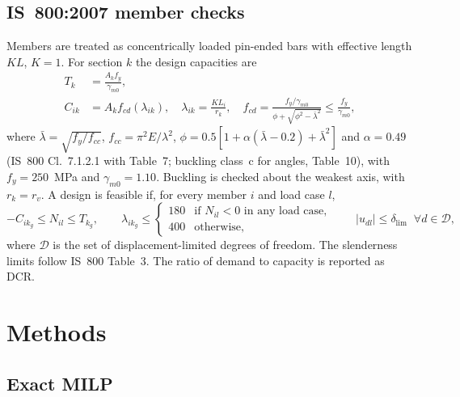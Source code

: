 \documentclass[lineno,pdflatex,sn-mathphys-num]{sn-jnl}
\begin{document}
\subsection{IS~800:2007 member checks}
Members are treated as concentrically loaded pin-ended bars with effective
length $KL$, $K=1$. For section $k$ the design capacities are
\begin{align}
  T_{k} &= \frac{A_k f_y}{\gamma_{m0}}, \label{eq:T}\\
  C_{ik} &= A_k f_{cd}(\lambda_{ik}),\quad \lambda_{ik}=\frac{KL_i}{r_k},\quad
  f_{cd}=\frac{f_y/\gamma_{m0}}{\phi+\sqrt{\phi^2-\bar\lambda^2}}\le\frac{f_y}{\gamma_{m0}},
  \label{eq:C}
\end{align}
where $\bar\lambda=\sqrt{f_y/f_{cc}}$, $f_{cc}=\pi^2E/\lambda^2$,
$\phi=0.5[1+\alpha(\bar\lambda-0.2)+\bar\lambda^2]$ and $\alpha=0.49$
(IS~800 Cl.~7.1.2.1 with Table~7; buckling class~c for angles, Table~10), with $f_y=250$~MPa and
$\gamma_{m0}=1.10$. Buckling is checked about the weakest axis, with $r_k=r_v$. A design is
feasible if, for every member $i$ and load case $l$,
\begin{equation}
  -C_{ik_g}\le N_{il}\le T_{k_g},\qquad
  \lambda_{ik_g}\le\begin{cases}180 & \text{if } N_{il}<0 \text{ in any load case},\\ 400 & \text{otherwise,}\end{cases}
  \qquad |u_{dl}|\le\delta_{\mathrm{lim}}\;\;\forall d\in\mathcal D ,
  \label{eq:feas}
\end{equation}
where $\mathcal D$ is the set of displacement-limited degrees of freedom. The
slenderness limits follow IS~800 Table~3. The ratio of demand to capacity is
reported as DCR.

\section{Methods}
\label{sec:methods}

\subsection{Exact MILP}
\label{sec:milp}
\end{document}
